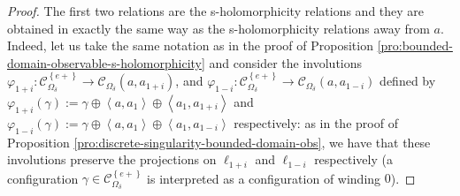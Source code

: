 \documentclass[oneside,english]{amsart}
\numberwithin{equation}{section}
\numberwithin{figure}{section}
\theoremstyle{plain}
\theoremstyle{plain}
\theoremstyle{plain}
\theoremstyle{plain}
\theoremstyle{plain}
\theoremstyle{definition}
\theoremstyle{remark}
\begin{document}
\begin{proof}
The first two relations are the s-holomorphicity relations and they
are obtained in exactly the same way as the s-holomorphicity relations
away from $a$. Indeed, let us take the same notation as in the proof
of Proposition \ref{pro:bounded-domain-observable-s-holomorphicity}
and consider the involutions $\varphi_{1+i}:\mathcal{C}_{\Omega_{\delta}}^{\left\{ e+\right\} }\to\mathcal{C}_{\Omega_{\delta}}\left(a,a_{1+i}\right)$,
and $\varphi_{1-i}:\mathcal{C}_{\Omega_{\delta}}^{\left\{ e+\right\} }\to\mathcal{C}_{\Omega_{\delta}}\left(a,a_{1-i}\right)$
defined by $\varphi_{1+i}\left(\gamma\right):=\gamma\oplus\left\langle a,a_{1}\right\rangle \oplus\left\langle a_{1},a_{1+i}\right\rangle $
and $\varphi_{1-i}\left(\gamma\right):=\gamma\oplus\left\langle a,a_{1}\right\rangle \oplus\left\langle a_{1},a_{1-i}\right\rangle $
respectively: as in the proof of Proposition \ref{pro:discrete-singularity-bounded-domain-obs},
we have that these involutions preserve the projections on $\ell_{1+i}$
and $\ell_{1-i}$ respectively (a configuration $\gamma\in\mathcal{C}_{\Omega_{\delta}}^{\left\{ e+\right\} }$
is interpreted as a configuration of winding $0$). 


\end{proof}
\end{document}
